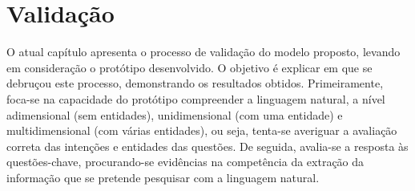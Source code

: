 \chapter{Validação}
\label{chap:Chapter6}
O atual capítulo apresenta o processo de validação do modelo proposto, levando em consideração o protótipo desenvolvido. O objetivo é explicar em que se debruçou este processo, demonstrando os resultados obtidos. Primeiramente, foca-se na capacidade do protótipo compreender a linguagem natural, a nível adimensional (sem entidades), unidimensional (com uma entidade) e multidimensional (com várias entidades), ou seja, tenta-se averiguar a avaliação correta das intenções e entidades das questões. De seguida, avalia-se a resposta às questões-chave, procurando-se evidências na competência da extração da informação que se pretende pesquisar com a linguagem natural.


